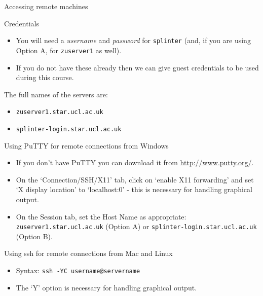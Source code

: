 \documentclass{beamer}
\begin{document}
\begin{frame}{Accessing remote machines}
  \begin{block}{Credentials}
    \begin{itemize}
      \item You will need a \textit{username} and \textit{password} for \texttt{splinter} (and, if you are using Option A, for \texttt{zuserver1} as well).
      \item If you do not have these already then we can give guest credentials to be used during this course.
    \end{itemize}
  \end{block}
  \begin{block}{The full names of the servers are:}
    \begin{itemize}
      \item \texttt{zuserver1.star.ucl.ac.uk}
      \item \texttt{splinter-login.star.ucl.ac.uk}
    \end{itemize}
  \end{block}
\end{frame}


\begin{frame}{Using PuTTY for remote connections from Windows}
  \begin{itemize}
    \item If you don't have PuTTY you can download it from \url{http://www.putty.org/}.
    \item On the `Connection/SSH/X11' tab, click on `enable X11 forwarding' and set `X display location' to `localhost:0' - this is necessary for handling graphical output.
    \item On the Session tab, set the Host Name as appropriate: \texttt{zuserver1.star.ucl.ac.uk} (Option A) or \texttt{splinter-login.star.ucl.ac.uk} (Option B).
  \end{itemize}
\end{frame}

\begin{frame}{Using ssh for remote connections from Mac and Linux}
  \begin{itemize}
    \item Syntax: \alert{\texttt{ssh -YC username@servername}}
    \item The `Y' option is necessary for handling graphical output.
  \end{itemize}
\end{frame}
\end{document}
